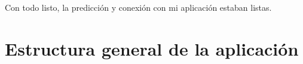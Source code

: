 	Con todo listo, la predicción y conexión con mi aplicación estaban listas.
	
\section{Estructura general de la aplicación}
	

%	
%	
%	
%
%
